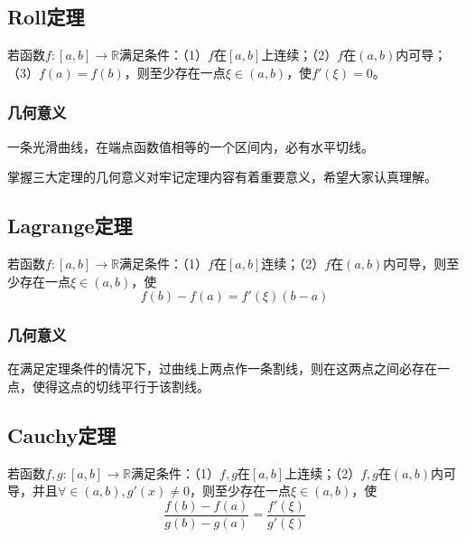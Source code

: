 \subsection{Roll定理}\label{sec:4.3.1}

\begin{theorem}
	若函数$f:[a,b]\to\mathbb{R}$满足条件：（1）$f$在$[a,b]$上连续；（2）$f$在$(a,b)$内可导；（3）$f(a)=f(b)$，则至少存在一点$\xi\in (a,b)$，使$f'(\xi)=0$。
\end{theorem}

\subsubsection{几何意义}
一条光滑曲线，在端点函数值相等的一个区间内，必有水平切线。

\begin{remark}
	掌握三大定理的几何意义对牢记定理内容有着重要意义，希望大家认真理解。
\end{remark}

\subsection{Lagrange定理}\label{sec:4.3.2}

\begin{theorem}
	若函数$f:[a,b]\to\mathbb{R}$满足条件：（1）$f$在$[a,b]$连续；（2）$f$在$(a,b)$内可导，则至少存在一点$\xi\in (a,b)$，使
	\begin{equation}
		f(b)-f(a)=f'(\xi)(b-a)\label{eq:4.2}
	\end{equation}
\end{theorem}

\subsubsection{几何意义}
在满足定理条件的情况下，过曲线上两点作一条割线，则在这两点之间必存在一点，使得这点的切线平行于该割线。
\subsection{Cauchy定理}\label{sec:4.3.3}

\begin{theorem}
	若函数$f,g:[a,b]\to\mathbb{R}$满足条件：（1）$f,g$在$[a,b]$上连续；（2）$f,g$在$(a,b)$内可导，并且$\forall \in (a,b),g'(x)\neq 0$，则至少存在一点$\xi\in (a,b)$，使
	\begin{equation}
		\frac{f(b)-f(a)}{g(b)-g(a)}=\frac{f'(\xi)}{g'(\xi)}\label{eq:4.3}
	\end{equation}
\end{theorem}

